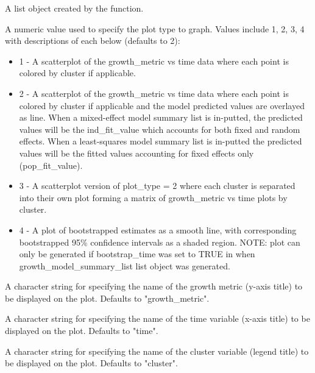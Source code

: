 \documentclass[a4paper]{book}
\begin{document}
\begin{Arguments}
\begin{ldescription}
\item[\code{growth\_model\_summary\_list}] A list object created by the
 function.

\item[\code{plot\_type}] A numeric value used to specify the plot type to graph.
Values include 1, 2, 3, 4 with descriptions of each below (defaults to 2):
\begin{itemize}

\item{} 1 - A scatterplot of the growth\_metric vs time data where each
point is colored by cluster if applicable.
\item{} 2 - A scatterplot of the growth\_metric vs time data where each
point is colored by cluster if applicable and the model predicted values
are overlayed as line.
When a mixed-effect model summary list is in-putted, the predicted values
will be the ind\_fit\_value which accounts for both fixed and random effects.
When a least-squares model summary list is in-putted the predicted values
will be the fitted values accounting for fixed effects only (pop\_fit\_value).
\item{} 3 - A scatterplot version of plot\_type = 2 where each cluster is
separated into their own plot forming a matrix of growth\_metric vs time
plots by cluster.
\item{} 4 - A plot of bootstrapped estimates as a smooth line,
with corresponding bootstrapped 95\% confidence intervals as a
shaded region. NOTE: plot can only be generated if
bootstrap\_time was set to TRUE in  when
growth\_model\_summary\_list list object was generated.

\end{itemize}


\item[\code{growth\_metric\_name}] A character string for specifying the name of
the growth metric (y-axis title) to be displayed on the plot.
Defaults to "growth\_metric".

\item[\code{time\_name}] A character string for specifying the name of the time
variable (x-axis title) to be displayed on the plot. Defaults to "time".

\item[\code{cluster\_name}] A character string for specifying the name of the
cluster variable (legend title) to be displayed on the plot.
Defaults to "cluster".


\end{ldescription}
\end{Arguments}
\end{document}
